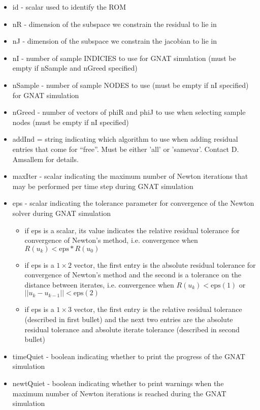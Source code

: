 \documentclass[notitlepage]{report}
\begin{document}
\begin{itemize}
    \item id - scalar used to identify the ROM
    \item nR  - dimension of the subspace we constrain the residual to lie in
    \item nJ  - dimension of the subspace we constrain the jacobian to lie in
    \item nI - number of sample INDICIES to use for GNAT simulation (must be empty if nSample and nGreed specified)
    \item nSample - number of sample NODES to use (must be empty if nI specified) for GNAT simulation
    \item nGreed  - number of vectors of phiR and phiJ to use when selecting sample nodes (must be empty if nI specified)
    \item addInd = string indicating which algorithm to use when adding  residual entries that come for ``free''.  Must be either 'all' or 'samevar'.  Contact D. Amsallem for details.
  \item maxIter - scalar indicating the maximum number of Newton iterations that may be performed per time step during GNAT simulation
  \item eps - scalar indicating the tolerance parameter for convergence of the Newton solver during GNAT simulation
        \begin{itemize}
        \item if eps is a scalar, its value indicates the relative residual tolerance for convergence of Newton's method, i.e. convergence when $R(u_k) < \text{eps}*R(u_0)$
        \item if eps is a $1 \times 2$ vector, the first entry is the absolute residual tolerance for convergence of Newton's method and the second is a tolerance on the distance between iterates, i.e. convergence when $R(u_k) < \text{eps}(1)$ or $||u_{k} - u_{k-1}|| < \text{eps}(2)$
        \item if eps is a $1 \times 3$ vector, the first entry is the relative residual tolerance (described in first bullet) and the next two entries are the absolute residual tolerance and absolute iterate tolerance (described in second bullet)
      \end{itemize}
  \item timeQuiet - boolean indicating whether to print the progress of the GNAT simulation
  \item newtQuiet - boolean indicating whether to print warnings when the maximum number of Newton iterations is reached during the GNAT simulation
 \end{itemize}
\end{document}
